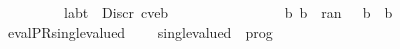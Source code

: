 \begin{isabellebody}
\ \ \ \ \ \ \ {\isasymand}\ {\isacharparenleft}{\isasymforall}\ {\isacharparenleft}{\isacharparenleft}lab{\isacharcomma}{\isasymbeta}{\isacharparenright}{\isacharcomma}t{\isacharparenright}\ {\isasymin}\ {\isasymC}{\isasymcdot}{\isacharparenleft}Discr\ {\isacharparenleft}c{\isacharcomma}{\isasymbeta}{\isacharprime}{\isacharcomma}ve{\isacharcomma}b{\isacharparenright}{\isacharparenright}{\isachardot}\isanewline
\ \ \ \ \ \ \ \ \ \ \ \ \ \ \ {\isasymexists}\ b{\isacharprime}{\isachardot}\ b{\isacharprime}\ {\isasymin}\ ran\ {\isasymbeta}\ {\isasymand}\ b\ {\isasymle}\ b{\isacharprime}{\isacharparenright}\isanewline
\ \ \ \ \ \ \ {\isacharparenright}{\isachardoublequoteclose}\isanewline
%
\isadelimproof
%
\endisadelimproof
\isanewline
{}\isamarkupfalse%
\ evalPR{\isacharunderscore}single{\isacharunderscore}valued{\isacharcolon}\isanewline%
\ \ \ \  {\isachardoublequoteopen}single{\isacharunderscore}valued\ {\isacharparenleft}{\isasymPR}\ prog{\isacharparenright}{\isachardoublequoteclose}
\end{isabellebody}%
